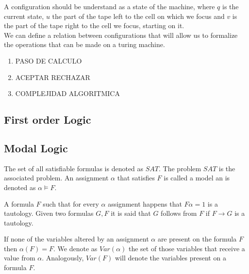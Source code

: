 \begin{definition}
A configuration should be understand as a state of the machine, where $q$ is the current state, $u$ the part of the tape left to the cell on which we focus and $v$ is the part of the tape right to the cell we focus, starting on it.\\

We can define a relation between configurations that will allow us to formalize the operations that can be made on a turing machine.



\begin{enumerate}
\item PASO DE CALCULO
\item ACEPTAR RECHAZAR
\item COMPLEJIDAD ALGORITMICA
\end{enumerate}
  


\subsection{First order Logic}

\subsection{Modal Logic}




    \begin{definition}
 The set of all satisfiable formulas is denoted as $SAT$.  The problem $SAT$ is the associated problem. 	An assignment $\alpha$ that satisfies $F$ is called a model an is denoted as $\alpha \models F$.\end{definition}
    A formula $F$ such that for every  $\alpha$ assignment happens that $F\alpha=1$ is a tautology. Given two formulas $G,F$ it is said that $G$ follows from $F$ if $F\to G$ is a tautology. \\
   
    \end{definition}
      If none of the variables altered by an assignment $\alpha$ are present on the formula $F$ then $\alpha(F) = F$. We denote as $Var(\alpha)$ the set of those variables that receive a value from $\alpha$. Analogously, $Var(F)$ will denote the variables present on a formula $F$.

